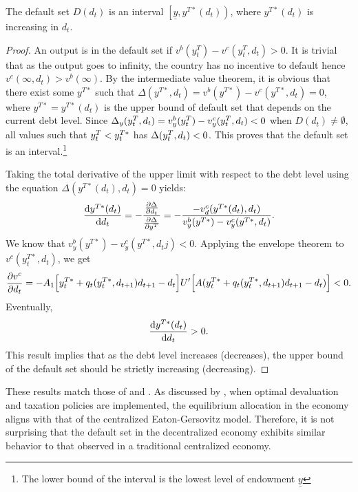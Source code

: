 \begin{proposition}
    \label{prop3}
    The default set $D(d_t)$ is an interval $\left[\underline{y}, y^{T*}(d_t) \right)$, where $y^{T*}(d_t)$ is increasing in $d_t$.
\end{proposition}
\begin{proof}
    An output is in the default set if $v^b(y^T_t) - v^c(y^T_t, d_t) >0$. It is trivial that as the output goes to infinity, the country has no incentive to default hence $v^c(\infty, d_t) > v^b(\infty)$. By the intermediate value theorem, it is obvious that there exist some $y^{T*}$ such that $\Delta(y^{T*}, d_t) = v^b(y^{T*}) - v^c(y^{T*}, d_t) = 0$, where $y^{T*} = y^{T*}(d_t)$ is the upper bound of default set that depends on the current debt level. Since  $\Delta_y(y^T_{t}, d_t) = v^b_y(y^T_{t}) - v^c_y(y^T_t, d_t) < 0$ when $D(d_t) \ne \emptyset$, all values such that  $y^T_{t} < y^{T*}_t$ has $\Delta(y^T_{t}, d_t) <0$. This proves that the default set is an interval.\footnote{The lower bound of the interval is the lowest level of endowment $\underline{y}$}

    Taking the total derivative of the upper limit with respect to the debt level using the equation $\Delta(y^{T*}(d_t), d_t) = 0$ yields:
    \begin{equation*}
        \dv{y^{T*}(d_t)}{d_t} = - \frac{\pdv{\Delta}{d_t}}{\pdv{\Delta}{y^{T}}} = - \frac{-v^c_d(y^{T*}(d_t), d_t)}{v^b_y(y^{T*}) - v^c_y(y^{T*}, d_t)}.
    \end{equation*}
    We know that $v^b_y(y^{T*}) - v^c_y(y^{T*}, d_tj) < 0$. Applying the envelope theorem to $v^c(y^{T*}_t, d_t)$, we get
    \begin{equation*}
        \pdv{v^c}{d_t} = -A_1\Big[y^{T*}_t + q_t(y^{T*}_t, d_{t+1})d_{t+1} - d_t\Big] U'\Big[A(y^{T*}_t + q_t(y^{T*}_t, d_{t+1})d_{t+1} - d_t)\Big]<0.
    \end{equation*}
    Eventually,
    \begin{equation}
        \dv{y^{T*}(d_t)}{d_t} > 0.
    \end{equation}
    This result implies that as the debt level increases (decreases), the upper bound of the default set should be strictly increasing (decreasing).
\end{proof}

These results match those of \citet{Arellano-08} and \citet{Uribe-Schmitt-Grohe-textbook}. As discussed by \citet{Na-18}, when optimal devaluation and taxation policies are implemented, the equilibrium allocation in the economy aligns with that of the centralized Eaton-Gersovitz model. Therefore, it is not surprising that the default set in the decentralized economy exhibits similar behavior to that observed in a traditional centralized economy.
